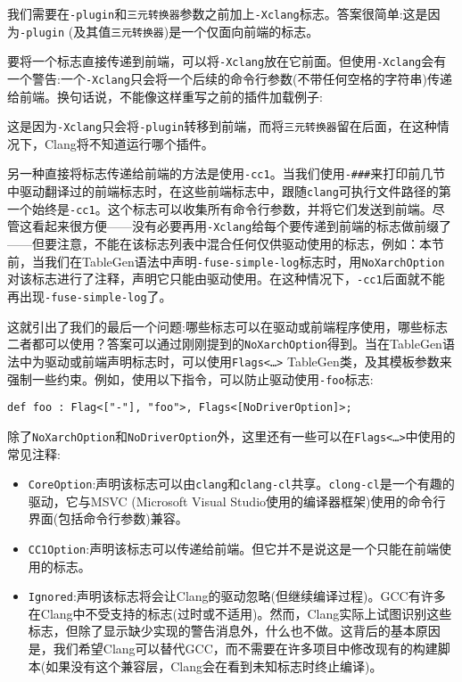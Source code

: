 我们需要在\texttt{-plugin}和\texttt{三元转换器}参数之前加上\texttt{-Xclang}标志。答案很简单:这是因为\texttt{-plugin} (及其值\texttt{三元转换器})是一个仅面向前端的标志。

要将一个标志直接传递到前端，可以将\texttt{-Xclang}放在它前面。但使用\texttt{-Xclang}会有一个警告:一个\texttt{-Xclang}只会将一个后续的命令行参数(不带任何空格的字符串)传递给前端。换句话说，不能像这样重写之前的插件加载例子:


这是因为\texttt{-Xclang}只会将\texttt{-plugin}转移到前端，而将\texttt{三元转换器}留在后面，在这种情况下，Clang将不知道运行哪个插件。

另一种直接将标志传递给前端的方法是使用\texttt{-cc1}。当我们使用\texttt{-\#\#\#}来打印前几节中驱动翻译过的前端标志时，在这些前端标志中，跟随\texttt{clang}可执行文件路径的第一个始终是\texttt{-cc1}。这个标志可以收集所有命令行参数，并将它们发送到前端。尽管这看起来很方便——没有必要再用\texttt{-Xclang}给每个要传递到前端的标志做前缀了——但要注意，不能在该标志列表中混合任何仅供驱动使用的标志，例如：本节前，当我们在TableGen语法中声明\texttt{-fuse-simple-log}标志时，用\texttt{NoXarchOption}对该标志进行了注释，声明它只能由驱动使用。在这种情况下，\texttt{-cc1}后面就不能再出现\texttt{-fuse-simple-log}了。

这就引出了我们的最后一个问题:哪些标志可以在驱动或前端程序使用，哪些标志二者都可以使用？答案可以通过刚刚提到的\texttt{NoXarchOption}得到。当在TableGen语法中为驱动或前端声明标志时，可以使用\texttt{Flags<…>} TableGen类，及其模板参数来强制一些约束。例如，使用以下指令，可以防止驱动使用\texttt{-foo}标志:

\begin{lstlisting}[style=styleJavaScript]
def foo : Flag<["-"], "foo">, Flags<[NoDriverOption]>;
\end{lstlisting}

除了\texttt{NoXarchOption}和\texttt{NoDriverOption}外，这里还有一些可以在\texttt{Flags<…>}中使用的常见注释:

\begin{itemize}
\item \texttt{CoreOption}:声明该标志可以由\texttt{clang}和\texttt{clang-cl}共享。\texttt{clong-cl}是一个有趣的驱动，它与MSVC (Microsoft Visual Studio使用的编译器框架)使用的命令行界面(包括命令行参数)兼容。

\item \texttt{CC1Option}:声明该标志可以传递给前端。但它并不是说这是一个只能在前端使用的标志。

\item \texttt{Ignored}:声明该标志将会让Clang的驱动忽略(但继续编译过程)。GCC有许多在Clang中不受支持的标志(过时或不适用)。然而，Clang实际上试图识别这些标志，但除了显示缺少实现的警告消息外，什么也不做。这背后的基本原因是，我们希望Clang可以替代GCC，而不需要在许多项目中修改现有的构建脚本(如果没有这个兼容层，Clang会在看到未知标志时终止编译)。
\end{itemize}

